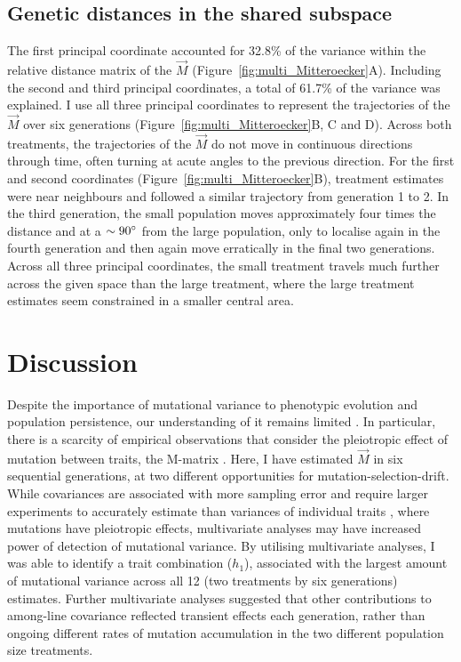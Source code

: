 \subsection{Genetic distances in the shared subspace}

The first principal coordinate accounted for 32.8\% of the variance within the relative distance matrix of the $\vec{M}$ (Figure~\ref{fig:multi_Mitteroecker}A). Including the second and third principal coordinates, a total of 61.7\% of the variance was explained. I use all three principal coordinates to represent the trajectories of the $\vec{M}$ over six generations (Figure~\ref{fig:multi_Mitteroecker}B, C and D). Across both treatments, the trajectories of the $\vec{M}$ do not move in continuous directions through time, often turning at acute angles to the previous direction. For the first and second coordinates (Figure~\ref{fig:multi_Mitteroecker}B), treatment estimates were near neighbours and followed a similar trajectory from generation 1 to 2. In the third generation, the small population moves approximately four times the distance and at a $\sim90\degree$ from the large population, only to localise again in the fourth generation and then again move erratically in the final two generations. Across all three principal coordinates, the small treatment travels much further across the given space than the large treatment, where the large treatment estimates seem constrained in a smaller central area.\par

\section{Discussion}
Despite the importance of mutational variance to phenotypic evolution and population persistence, our understanding of it remains limited \citep{Wals18}. In particular, there is a scarcity of empirical observations that consider the pleiotropic effect of mutation between traits, the M-matrix \citep{Jone07}. Here, I have estimated $\vec{M}$ in six sequential generations, at two different opportunities for mutation-selection-drift. While covariances are associated with more sampling error and require larger experiments to accurately estimate than variances of individual traits \citep{Klei74}, where mutations have pleiotropic effects, multivariate analyses may have increased power of detection of mutational variance. By utilising multivariate analyses, I was able to identify a trait combination ($h_1$), associated with the largest amount of mutational variance across all 12 (two treatments by six generations) estimates. Further multivariate analyses suggested that other contributions to among-line covariance reflected transient effects each generation, rather than ongoing different rates of mutation accumulation in the two different population size treatments.\par 

